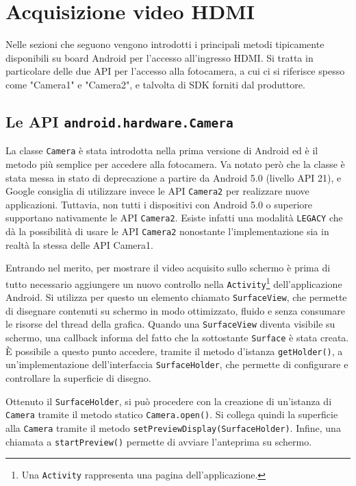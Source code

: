 \chapter{Acquisizione video HDMI}
\label{cha:hdmi}

Nelle sezioni che seguono vengono introdotti i principali metodi tipicamente disponibili su board Android per l'accesso all'ingresso HDMI. Si tratta in particolare delle due API per l'accesso alla fotocamera, a cui ci si riferisce spesso come "Camera1" e "Camera2", e talvolta di SDK forniti dal produttore.


\section{Le API \texttt{android.hardware.Camera}}
\label{sec:hdmi_camera1}

La classe \texttt{Camera} è stata introdotta nella prima versione di Android ed è il metodo più semplice per accedere alla fotocamera. Va notato però che la classe è stata messa in stato di deprecazione a partire da Android 5.0 (livello API 21), e Google consiglia di utilizzare invece le API \texttt{Camera2} per realizzare nuove applicazioni.\footnotemark{} Tuttavia, non tutti i dispositivi con Android 5.0 o superiore supportano nativamente le API \texttt{Camera2}. Esiste infatti una modalità \texttt{LEGACY} che dà la possibilità di usare le API \texttt{Camera2} nonostante l'implementazione sia in realtà la stessa delle API Camera1.


Entrando nel merito, per mostrare il video acquisito sullo schermo è prima di tutto necessario aggiungere un nuovo controllo nella \texttt{Activity}\footnote{Una \texttt{Activity} rappresenta una pagina dell'applicazione.} dell'applicazione Android. Si utilizza per questo un elemento chiamato \texttt{SurfaceView}, che permette di disegnare contenuti su schermo in modo ottimizzato, fluido e senza consumare le risorse del thread della grafica. Quando una \texttt{SurfaceView} diventa visibile su schermo, una callback informa del fatto che la sottostante \texttt{Surface} è stata creata. È possibile a questo punto accedere, tramite il metodo d'istanza \texttt{getHolder()}, a un'implementazione dell'interfaccia \texttt{SurfaceHolder}, che permette di configurare e controllare la superficie di disegno.

Ottenuto il \texttt{SurfaceHolder}, si può procedere con la creazione di un'istanza di \texttt{Camera} tramite il metodo statico \texttt{Camera.open()}. Si collega quindi la superficie alla \texttt{Camera} tramite il metodo \texttt{setPreviewDisplay(SurfaceHolder)}. Infine, una chiamata a \texttt{startPreview()} permette di avviare l'anteprima su schermo.

